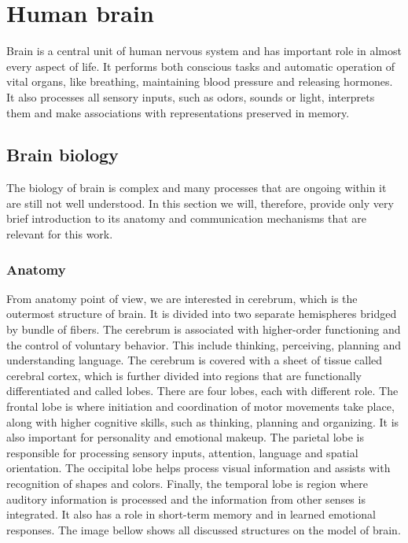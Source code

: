 \chapter{Human brain}
\label{humanBrain}
Brain is a central unit of human nervous system and has important role in almost
every aspect of life. It performs both conscious tasks and automatic operation
of vital organs, like breathing, maintaining blood pressure and releasing
hormones. It also processes all sensory inputs, such as odors, sounds or light,
interprets them and make associations with representations preserved in memory.
\section{Brain biology}
The biology of brain is complex and many processes that are ongoing within it
are still not well understood. In this section we will, therefore, provide only
very brief introduction to its anatomy and communication mechanisms that are
relevant for this work.
\subsection{Anatomy}
From anatomy point of view, we are interested in cerebrum, which is the
outermost structure of brain. It is divided into two separate hemispheres
bridged by bundle of fibers. The cerebrum is associated with higher-order
functioning and the control of voluntary behavior. This include thinking,
perceiving, planning and understanding language. The cerebrum is covered with a
sheet of tissue called cerebral cortex, which is further divided into regions
that are functionally differentiated and called lobes. There are four lobes,
each with different role. The frontal lobe is where initiation and coordination
of motor movements take place, along with higher cognitive skills, such as
thinking, planning and organizing. It is also important for personality and
emotional makeup. The parietal lobe is responsible for processing sensory
inputs, attention, language and spatial orientation. The occipital lobe helps
process visual information and assists with recognition of shapes and colors.
Finally, the temporal lobe is region where auditory information is processed and
the information from other senses is integrated. It also has a role in
short-term memory and in learned emotional responses. \cite{brainFacts} The
image bellow shows all discussed structures on the model of brain.

